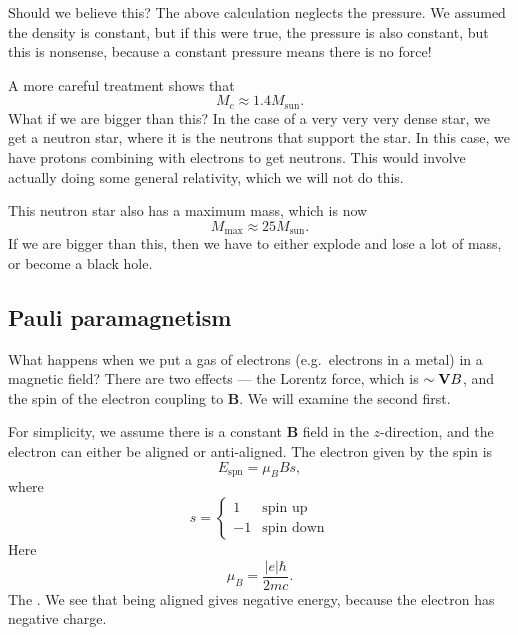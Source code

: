 \documentclass[a4paper]{article}
\begin{document}
Should we believe this? The above calculation neglects the pressure. We assumed the density is constant, but if this were true, the pressure is also constant, but this is nonsense, because a constant pressure means there is no force!

A more careful treatment shows that
\[
  M_c \approx 1.4 M_{\mathrm{sun}}.
\]
What if we are bigger than this? In the case of a very very very dense star, we get a neutron star, where it is the neutrons that support the star. In this case, we have protons combining with electrons to get neutrons. This would involve actually doing some general relativity, which we will not do this.

This neutron star also has a maximum mass, which is now
\[
  M_{\mathrm{max}} \approx 25 M_{\mathrm{sun}}.
\]
If we are bigger than this, then we have to either explode and lose a lot of mass, or become a black hole.

\subsection{Pauli paramagnetism}
What happens when we put a gas of electrons (e.g.\ electrons in a metal) in a magnetic field? There are two effects --- the Lorentz force, which is $\sim \mathbf{V}\mathbf \mathbf{B}$, and the spin of the electron coupling to $\mathbf{B}$. We will examine the second first.

For simplicity, we assume there is a constant $\mathbf{B}$ field in the $z$-direction, and the electron can either be aligned or anti-aligned. The electron given by the spin is
\[
  E_{\mathrm{spn}} = \mu_B B s,
\]
where
\[
  s =
  \begin{cases}
    1 & \text{spin up}\\
    -1 & \text{spin down}
  \end{cases}
\]
Here
\[
  \mu_B = \frac{|e| \hbar}{2mc}.
\]
The . We see that being aligned gives negative energy, because the electron has negative charge.
\end{document}
